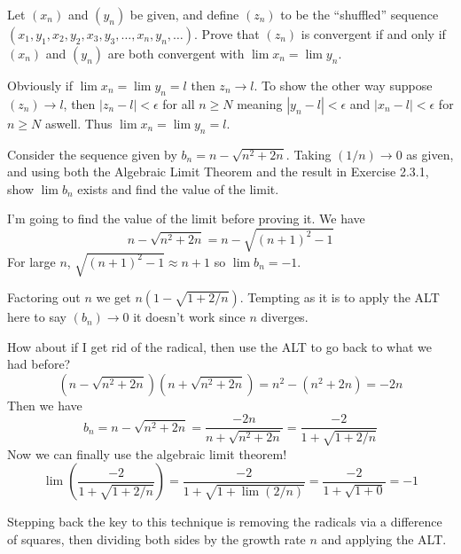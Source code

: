 \begin{exercise}
  Let $\left(x_{n}\right)$ and $\left(y_{n}\right)$ be given, and define $\left(z_{n}\right)$ to be the ``shuffled'' sequence $\left(x_{1}, y_{1}, x_{2}, y_{2}, x_{3}, y_{3}, \ldots, x_{n}, y_{n}, \ldots\right)$. Prove that $\left(z_{n}\right)$ is convergent if and only if $\left(x_{n}\right)$ and $\left(y_{n}\right)$ are both convergent with $\lim x_{n}=\lim y_{n}$.
\end{exercise}


\begin{solution}
  Obviously if $\lim x_n = \lim y_n = l$ then $z_n \to l$. To show the other way suppose $(z_n) \to l$, then $|z_n - l| < \epsilon$ for all $n \ge N$ meaning $|y_n - l| < \epsilon$ and $|x_n - l| < \epsilon$ for $n \ge N$ aswell. Thus $\lim x_n = \lim y_n = l$.
\end{solution}

\begin{exercise}
  Consider the sequence given by $b_{n}=n-\sqrt{n^{2}+2 n}$. Taking $(1 / n) \rightarrow 0$ as given, and using both the Algebraic Limit Theorem and the result in Exercise 2.3.1, show $\lim b_{n}$ exists and find the value of the limit.
\end{exercise}

\begin{solution}
  I'm going to find the value of the limit before proving it. We have
  $$
  n - \sqrt{n^2 + 2n} = n - \sqrt{(n + 1)^2 - 1}
  $$
  For large $n$, $\sqrt{(n + 1)^2 - 1} \approx n + 1$ so $\lim b_n = -1$.

  Factoring out $n$ we get $n\left(1 - \sqrt{1 + 2/n}\right)$. Tempting as it is to apply the ALT here to say $(b_n) \to 0$ it doesn't work since $n$ diverges.

  How about if I get rid of the radical, then use the ALT to go back to what we had before?
  $$
  (n - \sqrt{n^2 + 2n})(n + \sqrt{n^2 + 2n}) = n^2 - (n^2 + 2n) = -2n
  $$
  Then we have
  $$
  b_n = n - \sqrt{n^2 + 2n} = \frac{-2n}{n + \sqrt{n^2 + 2n}} = \frac{-2}{1 + \sqrt{1 + 2/n}}
  $$
  Now we can finally use the algebraic limit theorem!
  $$
  \lim\left(\frac{-2}{1 + \sqrt{1 + 2/n}}\right) = \frac{-2}{1 + \sqrt{1 + \lim\left(2/n\right)}} = \frac{-2}{1 + \sqrt{1 + 0}} = -1
  $$

  Stepping back the key to this technique is removing the radicals via a difference of squares, then dividing both sides by the growth rate $n$ and applying the ALT.
\end{solution}

